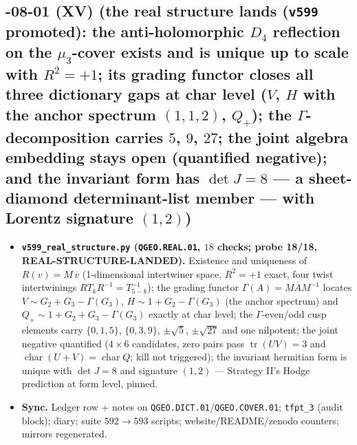 \subsection*{-08-01 (XV) (the real structure lands (\texttt{v599} promoted): the anti-holomorphic $D_4$ reflection on the $\mu_3$-cover exists and is unique up to scale with $R^2=+1$; its grading functor closes all three dictionary gaps at char level ($V$, $H$ with the anchor spectrum $(1,1,2)$, $Q_+$); the $\Gamma$-decomposition carries $5$, $9$, $27$; the joint algebra embedding stays open (quantified negative); and the invariant form has $\det J=8$ --- a sheet-diamond determinant-list member --- with Lorentz signature $(1,2)$)}
\begin{itemize}[leftmargin=1.5em]
\item \textbf{\texttt{v599\_real\_structure.py} (\texttt{QGEO.REAL.01}, $18$ checks; probe
18/18, REAL-STRUCTURE-LANDED).} Existence and uniqueness of $R(v)=M\,\overline{v}$
(1-dimensional intertwiner space, $R^2=+1$ exact, four twist intertwinings
$RT_kR^{-1}=T_{5-k}^{-1}$); the grading functor $\Gamma(A)=M\overline{A}M^{-1}$ locates
$V\sim G_2+G_3-\Gamma(G_3)$, $H\sim 1+G_2-\Gamma(G_3)$ (the anchor spectrum) and
$Q_+\sim 1+G_2+G_3-\Gamma(G_3)$ exactly at char level; the $\Gamma$-even/odd cusp elements
carry $\{0,1,5\}$, $\{0,3,9\}$, $\pm\sqrt5$, $\pm\sqrt{27}$ and one nilpotent; the joint
negative quantified ($4\times6$ candidates, zero pairs pass $\operatorname{tr}(UV)=3$ and
$\operatorname{char}(U+V)=\operatorname{char}Q$; kill not triggered); the invariant hermitian
form is unique with $\det J=8$ and signature $(1,2)$ --- Strategy II's Hodge prediction at
form level, pinned.
\item \textbf{Sync.} Ledger row + notes on \texttt{QGEO.DICT.01}/\texttt{QGEO.COVER.01};
\texttt{tfpt\_3} (audit block); diary; suite $592\to593$ scripts; website/README/zenodo
counters; mirrors regenerated.
\end{itemize}

